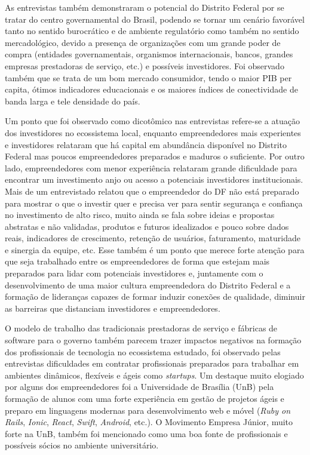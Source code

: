 As entrevistas também demonstraram o potencial do Distrito Federal por se tratar do centro governamental do Brasil, podendo se tornar um cenário favorável tanto no sentido burocrático e de ambiente regulatório como também no sentido mercadológico, devido a presença de organizações com um grande poder de compra (entidades governamentais, organismos internacionais, bancos, grandes empresas prestadoras de serviço, etc.) e possíveis investidores. Foi observado também que se trata de um bom mercado consumidor, tendo o maior PIB per capita, ótimos indicadores educacionais e os maiores índices de conectividade de banda larga e tele densidade do país.

Um ponto que foi observado como dicotômico nas entrevistas refere-se a atuação dos investidores no ecossistema local, enquanto empreendedores mais experientes e investidores relataram que há capital em abundância disponível no Distrito Federal mas poucos empreendedores preparados e maduros o suficiente. Por outro lado, empreendedores com menor experiência relataram grande dificuldade para encontrar um investimento anjo ou acesso a potenciais investidores institucionais. Mais de um entrevistado relatou que o empreendedor do DF não está preparado para mostrar o que o investir quer e precisa ver para sentir segurança e confiança no investimento de alto risco, muito ainda se fala sobre ideias e propostas abstratas e não validadas, produtos e futuros idealizados e pouco sobre dados reais, indicadores de crescimento, retenção de usuários, faturamento, maturidade e sinergia da equipe, etc. Esse também é um ponto que merece forte atenção para que seja trabalhado entre os empreendedores de forma que estejam mais preparados para lidar com potenciais investidores e, juntamente com o desenvolvimento de uma maior cultura empreendedora do Distrito Federal e a formação de lideranças capazes de formar induzir conexões de qualidade, diminuir as barreiras que distanciam investidores e empreendedores.

O modelo de trabalho das tradicionais prestadoras de serviço e fábricas de software para o governo também parecem trazer impactos negativos na formação dos profissionais de tecnologia no ecossistema estudado, foi observado pelas entrevistas dificuldades em contratar profissionais preparados para trabalhar em ambientes dinâmicos, flexíveis e ágeis como \textit{startups}. Um destaque muito elogiado por alguns dos empreendedores foi a Universidade de Brasília (UnB) pela formação de alunos com uma forte experiência em gestão de projetos ágeis e preparo em linguagens modernas para desenvolvimento web e móvel (\textit{Ruby on Rails}, \textit{Ionic}, \textit{React}, \textit{Swift}, \textit{Android}, etc.). O Movimento Empresa Júnior, muito forte na UnB, também foi mencionado como uma boa fonte de profissionais e possíveis sócios no ambiente universitário.

